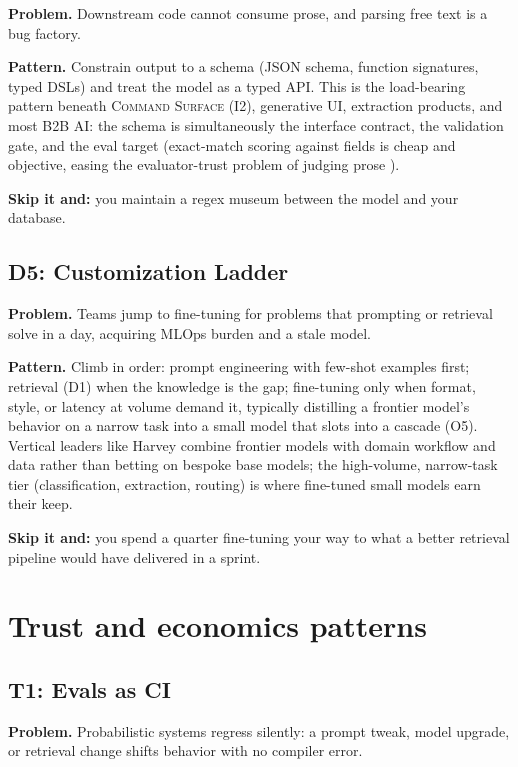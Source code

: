 \documentclass[11pt]{article}
\newcommand{\pat}[1]{\textsc{#1}}
\begin{document}
\textbf{Problem.} Downstream code cannot consume prose, and parsing free text
is a bug factory.

\textbf{Pattern.} Constrain output to a schema (JSON schema, function
signatures, typed DSLs) and treat the model as a typed API. This is the
load-bearing pattern beneath \pat{Command Surface} (I2), generative UI,
extraction products, and most B2B AI: the schema is simultaneously the
interface contract, the validation gate, and the eval target (exact-match
scoring against fields is cheap and objective, easing the evaluator-trust
problem of judging prose \citep{zheng2023judge}).

\textbf{Skip it and:} you maintain a regex museum between the model and your
database.

\subsection{D5: Customization Ladder}

\textbf{Problem.} Teams jump to fine-tuning for problems that prompting or
retrieval solve in a day, acquiring MLOps burden and a stale model.

\textbf{Pattern.} Climb in order: prompt engineering with few-shot examples
first; retrieval (D1) when the knowledge is the gap; fine-tuning only when
format, style, or latency at volume demand it, typically distilling a
frontier model's behavior on a narrow task into a small model that slots into
a cascade (O5). Vertical leaders like Harvey combine frontier models with
domain workflow and data rather than betting on bespoke base models; the
high-volume, narrow-task tier (classification, extraction, routing) is where
fine-tuned small models earn their keep.

\textbf{Skip it and:} you spend a quarter fine-tuning your way to what a
better retrieval pipeline would have delivered in a sprint.

\section{Trust and economics patterns}
\label{sec:trust}

\subsection{T1: Evals as CI}

\textbf{Problem.} Probabilistic systems regress silently: a prompt tweak,
model upgrade, or retrieval change shifts behavior with no compiler error.
\end{document}
